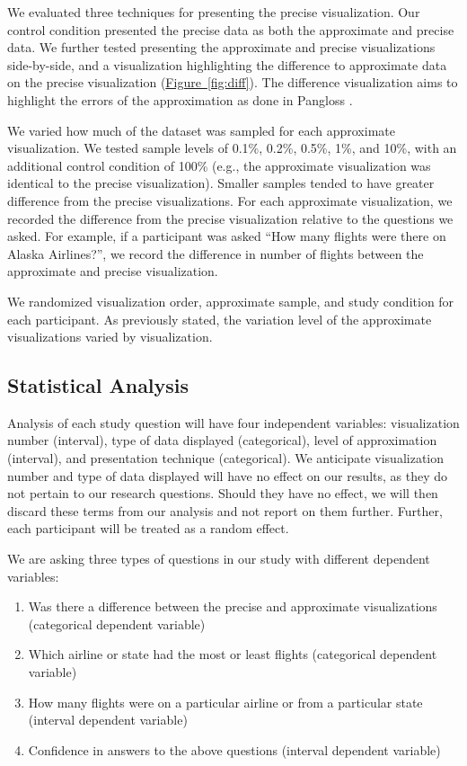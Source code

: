 \documentclass[10pt,journal,compsoc]{IEEEtran}
\newcommand{\figref}[1]{\hyperref[#1]{Figure~\ref*{#1}}}
\begin{document}
We evaluated three techniques for presenting the precise visualization.
Our control condition presented the precise data as both the approximate and precise data.
We further tested presenting the approximate and precise visualizations side-by-side, and a visualization highlighting the difference to approximate data on the precise visualization (\figref{fig:diff}).
The difference visualization aims to highlight the errors of the approximation as done in Pangloss \cite{moritz2017pangloss}.

We varied how much of the dataset was sampled for each approximate visualization.
We tested sample levels of 0.1\%, 0.2\%, 0.5\%, 1\%, and 10\%, with an additional control condition of 100\% (e.g., the approximate visualization was identical to the precise visualization).
Smaller samples tended to have greater difference from the precise visualizations.
For each approximate visualization, we recorded the difference from the precise visualization relative to the questions we asked.
For example, if a participant was asked ``How many flights were there on Alaska Airlines?'', we record the difference in number of flights between the approximate and precise visualization.

We randomized visualization order, approximate sample, and study condition for each participant.
As previously stated, the variation level of the approximate visualizations varied by visualization.

\subsection{Statistical Analysis}

Analysis of each study question will have four independent variables: visualization number (interval), type of data displayed (categorical), level of approximation (interval), and presentation technique (categorical).
We anticipate visualization number and type of data displayed will have no effect on our results, as they do not pertain to our research questions.
Should they have no effect, we will then discard these terms from our analysis and not report on them further.
Further, each participant will be treated as a random effect.

We are asking three types of questions in our study with different dependent variables:
\begin{enumerate}
\item Was there a difference between the precise and approximate visualizations (categorical dependent variable)
\item Which airline or state had the most or least flights (categorical dependent variable)
\item How many flights were on a particular airline or from a particular state (interval dependent variable)
\item Confidence in answers to the above questions (interval dependent variable)
\end{enumerate}
\end{document}
